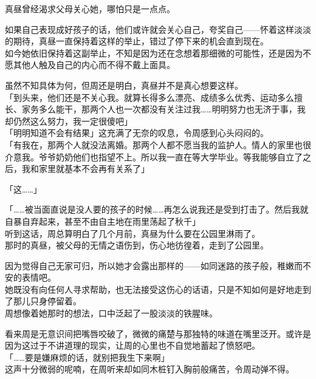 真昼曾经渴求父母关心她，哪怕只是一点点。

如果自己表现成好孩子的话，他们或许就会关心自己，夸奖自己——怀着这样淡淡的期待，真昼一直保持着这样的举止，错过了停下来的机会直到现在。\\

如今她依旧保持着这副举止，不知是因为还在念想着那细微的可能性，还是因为不愿其他人触及自己的内心而不得不戴上面具。

虽然不知具体为何，但周还是明白，真昼并不是真心想要这样。\\

「到头来，他们还是不关心我。就算长得多么漂亮、成绩多么优秀、运动多么擅长、家务多么能干，那两个人也一次都没有关注过我……明明努力也无济于事，我却仍然这么努力，我一定很傻吧」\\

「明明知道不会有结果」这充满了无奈的叹息，令周感到心头闷闷的。\\

「有我在，那两个人就没法离婚。那两个人都不愿当我的监护人。情人的家里也很介意我。爷爷奶奶他们也指望不上。所以我一直在等大学毕业。等我能够自立了之后，我和家里就基本不会再有关系了」

「这……」

「……被当面直说是没人要的孩子的时候……再怎么说我还是受到打击了。然后我就自暴自弃起来，甚至不由自主地在雨里荡起了秋千」\\

听到这话，周总算明白了几个月前，真昼为什么要在公园里淋雨了。\\

那时的真昼，被父母的无情之语伤到，伤心地彷徨着，走到了公园里。

因为觉得自己无家可归，所以她才会露出那样的——如同迷路的孩子般，稚嫩而不安的表情吧。\\

她既没有向任何人寻求帮助，也无法接受这伤心的话语，只是不知如何是好地走到了那儿只身停留着。\\

周想像着她那时的想法，口中泛起了一股淡淡的铁腥味。

看来周是无意识间把嘴唇咬破了，微微的痛楚与那独特的味道在嘴里泛开。或许是因为这过于不讲道理的现实，让周的心里也不自觉地蓄起了愤怒吧。\\

「……要是嫌麻烦的话，就别把我生下来啊」\\

这声十分微弱的呢喃，在周听来却如同木桩钉入胸前般痛苦，令周动弹不得。\\

